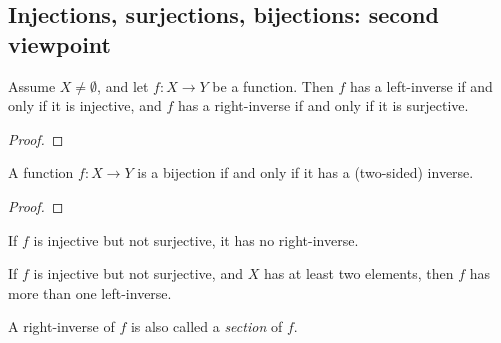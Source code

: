 \subsection{Injections, surjections, bijections: second viewpoint}
\label{subsec:prelims:injections-surjections-bijections-second-viewpoint}

\begin{proposition}[I.2.4]
  \label{prop:prelims:inv-inj-sur}
  \leanok
  Assume $X \neq \emptyset$, and let $f : X \to Y$ be a function.
  Then $f$ has a left-inverse if and only if it is injective, and $f$
  has a right-inverse if and only if it is surjective.
\end{proposition}
\begin{proof}
  \leanok
\end{proof}

\begin{corollary}[I.2.5]
  \label{coro:prelims:bijective-iff-inverse}
  \leanok
  A function $f : X \to Y$ is a bijection if and only if it has a
  (two-sided) inverse.
\end{corollary}
\begin{proof}
  \leanok
\end{proof}

\begin{proposition}
  \label{prop:prelims:no-right-inverse-of-injective-not-surjective}
  If $f$ is injective but not surjective, it has no right-inverse.
\end{proposition}

\begin{proposition}
  \label{prop:prelims:many-left-inverses}
  If $f$ is injective but not surjective, and $X$ has at least two
  elements, then $f$ has more than one left-inverse.
\end{proposition}

\begin{definition}[Section]
  \label{def:prelims:is-section}
  \leanok
  A right-inverse of $f$ is also called a \emph{section} of $f$.
\end{definition}

